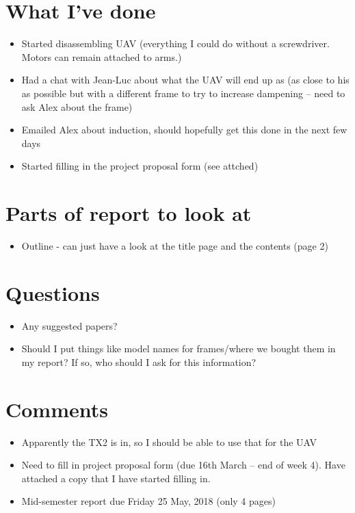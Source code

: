 \documentclass[12pt,a4paper]{article}
\begin{document}
\author{Katrina Ashton}


\pagestyle{fancy}
\fancyhf{}
\rhead{\thepage}

\section{What I've done}
\begin{itemize}
\item{Started disassembling UAV (everything I could do without a screwdriver. Motors can remain attached to arms.)}
\item{Had a chat with Jean-Luc about what the UAV will end up as (as close to his as possible but with a different frame to try to increase dampening -- need to ask Alex about the frame)}
\item{Emailed Alex about induction, should hopefully get this done in the next few days}
\item{Started filling in the project proposal form (see attched)}
\end{itemize}

\section{Parts of report to look at}
\begin{itemize}
\item{Outline - can just have a look at the title page and the contents (page 2)}
\end{itemize}

\section{Questions}
\begin{itemize}
\item{Any suggested papers?}
\item{Should I put things like model names for frames/where we bought them in my report? If so, who should I ask for this information?}
\end{itemize}

\section{Comments}
\begin{itemize}
\item{Apparently the TX2 is in, so I should be able to use that for the UAV}
\item{Need to fill in project proposal form (due 16th March -- end of week 4). Have attached a copy that I have started filling in.}
\item{Mid-semester report due Friday 25 May, 2018 (only 4 pages)}
\end{itemize}
\end{document}
